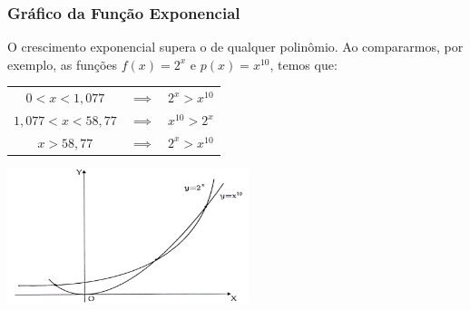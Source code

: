 \documentclass[brazil, notheorems, 10pt]{beamer}
\begin{document}

\begin{frame}
\frametitle{Gráfico da Função Exponencial} %

\begin{exemplo}
O crescimento exponencial supera o de qualquer polinômio. Ao
compararmos, por exemplo, as funções $f(x) = 2^x$ e
$p(x)=x^{10}$, temos que:\\
\begin{tabular}{ccc}
$0<x<1{,}077$ & $\implies$ & $2^x > x^{10}$\\
$1{,}077 < x < 58{,}77$ & $\implies$ & $x^{10} > 2^x$\\
$x>58{,}77$ & $\implies $& $2^x > x^{10}$
\end{tabular}
\begin{center}
\includegraphics[width=7cm]{figures/polXexp.jpg}
\end{center}
\end{exemplo}

\end{frame}

\end{document}
